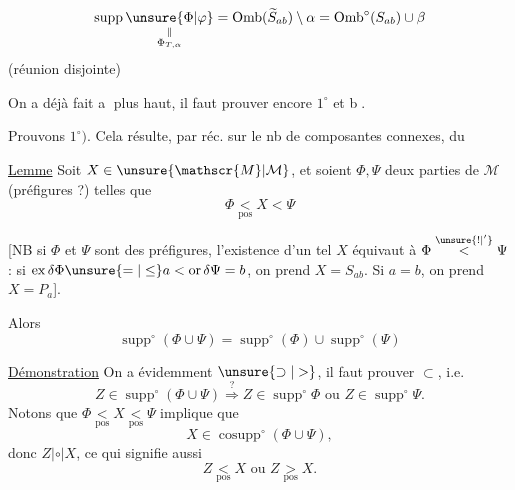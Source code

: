 
\[
\operatorname{supp}\underset{\substack{\parallel\\\Phi_{T,\alpha}}}{\unsure{\Phi|\varphi}}
=\operatorname{Omb}(\widetilde S_{ab})\setminus\alpha
=\operatorname{Omb}^{\circ}(S_{ab})\cup\beta
\]
\hfill(réunion disjointe)

On a déjà fait \textcircled{a} plus haut, il faut prouver encore \textcircled{\scriptsize $1^{\circ}$} et \textcircled{b}.

Prouvons $1^{\circ})$. Cela résulte, par réc. sur le nb de composantes connexes, du

\noindent{}%
\uline{Lemme} Soit $X\in\unsure{\mathscr{M}|\mathcal{M}}$, et soient $\Phi,\Psi$ deux parties de $\mathscr{M}$ (préfigures ?) telles que
\[
\Phi\underset{\mathrm{pos}}{<}X<\Psi
\]

[NB si $\Phi$ et $\Psi$ sont des préfigures, l'existence d'un tel $X$ équivaut à $\Phi\overset{\unsure{!|'}}{<}\Psi$ : si $\operatorname{ex}\delta\Phi\unsure{=|\leq}a<\operatorname{or}\delta\Psi=b$, on prend $X=S_{ab}$. Si $a=b$, on prend $X=P_a$].

Alors
\[
\operatorname{supp}^{\circ}(\Phi\cup\Psi)=\operatorname{supp}^{\circ}(\Phi)\cup\operatorname{supp}^{\circ}(\Psi)
\]

\uline{Démonstration} On a évidemment $\unsure{\supset|>}$, il faut prouver $\subset$, i.e.
\[
Z\in\operatorname{supp}^{\circ}(\Phi\cup\Psi)\overset{?}{\Longrightarrow}Z\in\operatorname{supp}^{\circ}\Phi\text{ ou }Z\in\operatorname{supp}^{\circ}\Psi.
\]
 Notons que $\Phi\underset{\mathrm{pos}}{<}X\underset{\mathrm{pos}}{<}\Psi$ implique que
\[
X\in\operatorname{cosupp}^{\circ}(\Phi\cup\Psi),
\]
donc $Z\mathrel{|\circ|}X$, ce qui signifie aussi
\[
Z\underset{\mathrm{pos}}{<}X\text{ ou }Z\underset{\mathrm{pos}}{>}X.
\]
